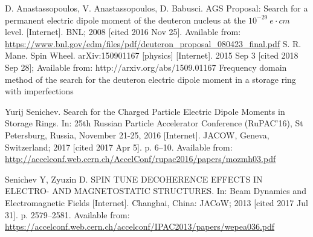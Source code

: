 \documentclass{article}
\begin{document}
\begin{thebibliography}{99}
  D. Anastassopoulos, V. Anastassopoulos, D. Babusci. AGS Proposal: Search for a permanent electric dipole moment of the deuteron nucleus at the $10^{−29} ~ e\cdot cm$ level. [Internet]. BNL; 2008 [cited 2016 Nov 25]. Available from: \url{https://www.bnl.gov/edm/files/pdf/deuteron_proposal_080423_final.pdf}
  S. R. Mane. Spin Wheel. arXiv:150901167 [physics] [Internet]. 2015 Sep 3 [cited 2018 Sep 28]; Available from: http://arxiv.org/abs/1509.01167
  Frequency domain method of the search for the deuteron electric dipole moment in a storage ring with imperfections

  Yurij Senichev. Search for the Charged Particle Electric Dipole Moments in Storage Rings. In: 25th Russian Particle Accelerator Conference (RuPAC’16), St Petersburg, Russia, November 21-25, 2016 [Internet]. JACOW, Geneva, Switzerland; 2017 [cited 2017 Apr 5]. p. 6–10. Available from: \url{http://accelconf.web.cern.ch/AccelConf/rupac2016/papers/mozmh03.pdf}

  Senichev Y, Zyuzin D. SPIN TUNE DECOHERENCE EFFECTS IN ELECTRO- AND  MAGNETOSTATIC STRUCTURES. In: Beam Dynamics and Electromagnetic Fields [Internet]. Changhai, China: JACoW; 2013 [cited 2017 Jul 31]. p. 2579--2581. Available from: \url{https://accelconf.web.cern.ch/accelconf/IPAC2013/papers/wepea036.pdf}

\end{thebibliography}
\end{document}
